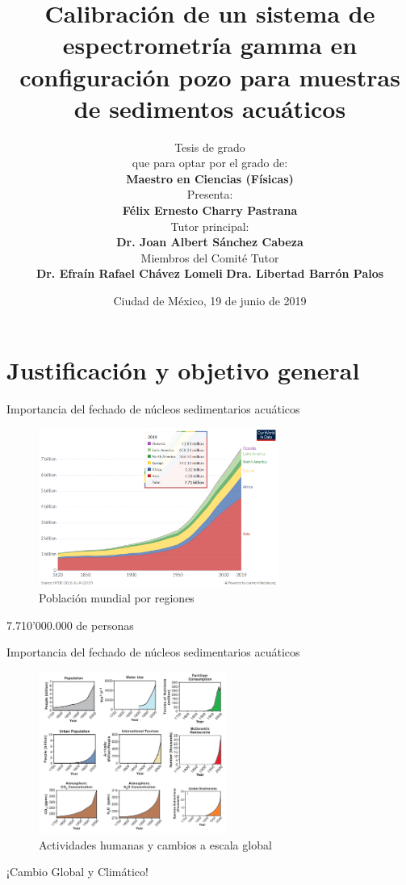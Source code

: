 \documentclass[9pt]{beamer}
\author{
Tesis de grado \\
que para optar por el grado de: \\
\textbf{Maestro en Ciencias (Físicas)}
\\
\vspace{0.5 cm}
Presenta: \\
\textbf{F\'elix Ernesto Charry Pastrana}\\
Tutor principal:\\
 \textbf{Dr. Joan Albert Sánchez Cabeza} \\
 Miembros del Comité Tutor \\ 
 \textbf{Dr. Efraín Rafael Chávez Lomeli} \hspace{1cm} \textbf{Dra. Libertad Barrón Palos}
}
\title[Calibración de un sistema de espectrometría gamma para muestras de sedimentos acuáticos]{\textbf{Calibración de un sistema de espectrometría gamma en configuración pozo para muestras de sedimentos acuáticos}}
\institute{
\begin{normalsize}
Universidad Nacional Autónoma de México
\end{normalsize}
}
\date{Ciudad de México, 19 de junio de 2019}
\begin{document}
\begin{frame}[label=Portada]
\titlepage
\begin{flushleft}
\hyperlink{Portada2}{}
\end{flushleft}
\end{frame}


\section{Justificación y objetivo general}

\begin{frame}{Importancia del fechado de núcleos sedimentarios acuáticos}
\begin{figure}
\centering
\includegraphics[width=0.7\textwidth]{Imagenes/WorldPopulationByRegion.png}
\caption{Población mundial por regiones\footnotemark}
\end{figure}
\begin{center}
7.710'000.000 de personas
\end{center}
\end{frame}

\begin{frame}{Importancia del fechado de núcleos sedimentarios acuáticos}
\begin{figure}
\centering
\includegraphics[width=0.55\textwidth]{Imagenes/Steffen2004.png}
\caption{Actividades humanas y cambios a escala global \footnotemark}
\end{figure}
\begin{center}
¡Cambio Global y Climático!
\end{center}
\end{frame}
\end{document}
